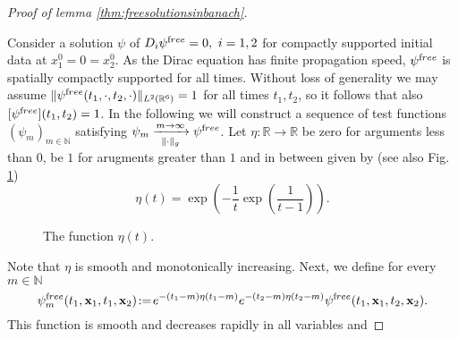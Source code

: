 \documentclass[b5paper,draft,openbib,12pt]{memoir}
\newcommand{\vx}{\mathbf{x}}
\newcommand{\free}{{\textup free}}
\begin{document}
\begin{proof}[Proof of lemma \ref{thm:freesolutionsinbanach}]
\label{sec:freesolutionsinbanach}

Consider a solution $\psi$ of $D_i \psi^\free = 0,~i=1,2$ for 
compactly supported initial data at $x_1^0 = 0 = x_2^0$. As the 
Dirac equation has finite propagation speed, $\psi^\free$  is 
spatially compactly supported for all times. Without loss of 
generality we may assume 
\(\|\psi^\free (t_1,\cdot,t_2,\cdot)\|_{L^2(\mathbb{R}^6)}=1\) for 
all times \(t_1,t_2\), so it follows that also 
\([\psi^\free](t_1,t_2)=1\). In the following we will construct a 
sequence of test functions \((\psi_m)_{m\in\mathbb{N}}\) 
satisfying \(\psi_m \xrightarrow[\|\cdot\|_g ]{m\rightarrow \infty} 
\psi^\free\). Let \(\eta : \mathbb{R}\rightarrow \mathbb{R}\) be 
zero for arguments less than \(0\), be \(1\) for 
arugments greater than \(1\) and in 
between given by (see also Fig. \ref{fig:eta})
\begin{equation}
	\eta(t)=  \exp\left(-\frac{1}{t} \exp\left({\frac{1}{t-1}}\right)\right).
\end{equation}
%
\begin{figure}
	\centering
	\caption{The function \( \eta(t)\).}
	\label{fig:eta}
\end{figure}
%
 Note that $\eta$ is smooth and monotonically increasing. Next, we 
 define for every \(m\in\mathbb{N}\)
 \begin{equation}
 \psi^\free_m(t_1,\vx_1, t_1, \vx_2)\! :=\! e^{-(t_1-m) \eta(t_1-m) } e^{-(t_2-m) \eta(t_2-m)} \psi^\free(t_1,\vx_1, t_2, \vx_2).
 \end{equation}
 This function is smooth and decreases rapidly in all variables and 

\end{proof}
\end{document}
